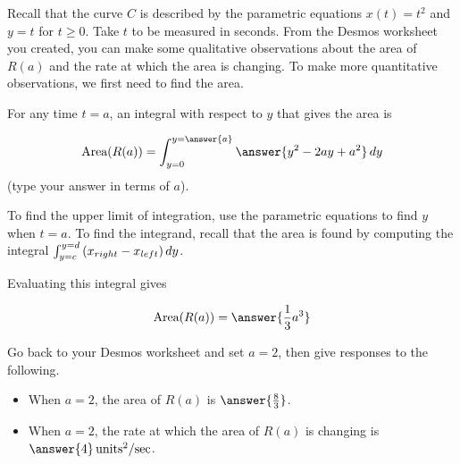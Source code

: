 \documentclass{ximera}
\author{Jim Talamo}
\begin{document}
\begin{exercise}
Recall that the curve $C$ is described by the parametric equations $x(t)=t^2$ and $y=t$ for $t \geq 0$.  Take $t$ to be measured in seconds.  From the Desmos worksheet you created, you can make some qualitative observations about the area of $R(a)$ and the rate at which the area is changing.  To make more quantitative observations, we first need to find the area.

For any time $t=a$, an integral with respect to $y$ that gives the area is

\[
\textrm{Area}(R(a)) = \int_{y= 0}^{y = \answer{a}} \answer{y^2-2ay+a^2} \d y
\]
(type your answer in terms of $a$).

\begin{hint}
To find the upper limit of integration, use the parametric equations to find $y$ when $t=a$.  To find the integrand, recall that the area is found by computing the integral $\int_{y=c}^{y=d} \left(x_{right}-x_{left} \right) \mathop{}\!d y$.
\end{hint}

Evaluating this integral gives

\[
\textrm{Area}(R(a)) = \answer{\frac{1}{3}a^3}
\]

\begin{exercise}
Go back to your Desmos worksheet and set $a=2$, then give responses to the following.

\begin{itemize}
\item When $a=2$, the area of $R(a)$ is $\answer{\frac{8}{3}}$.
\item When $a=2$, the rate at which the area of $R(a)$ is changing is $\answer{4} \unit{units^2/sec}$.
\end{itemize}

\end{exercise}

\end{exercise}
\end{document}
